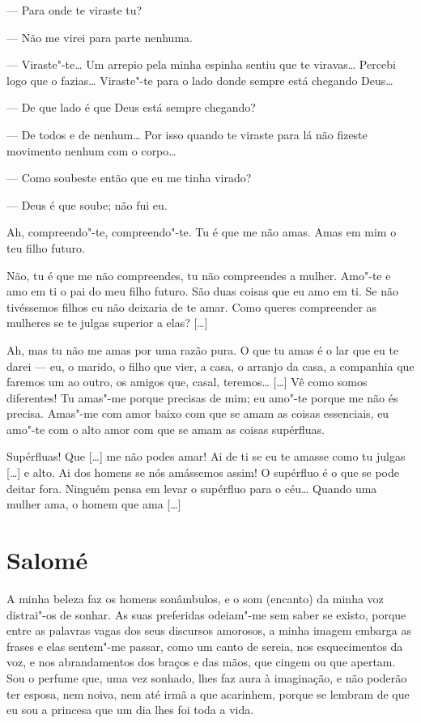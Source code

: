 \asterisc
\forceindent{}--- Para onde te viraste tu?

--- Não me virei para parte nenhuma.

--- Viraste"-te\ldots{} Um arrepio pela minha espinha sentiu que te viravas\ldots{}
Percebi logo que o fazias\ldots{} Viraste"-te para o lado donde sempre está
chegando Deus\ldots{}

--- De que lado é que Deus está sempre chegando?

--- De todos e de nenhum\ldots{} Por isso quando te viraste para lá não
fizeste movimento nenhum com o corpo\ldots{}

--- Como soubeste então que eu me tinha virado?

--- Deus é que soube; não fui eu.

\asterisc

 Ah, compreendo"-te, compreendo"-te. Tu é que me não amas. Amas em mim
o teu filho futuro.

 Não, tu é que me não compreendes, tu não compreendes a mulher.
Amo"-te e amo em ti o pai do meu filho futuro. São duas coisas que eu
amo em ti. Se não tivéssemos filhos eu não deixaria de te amar. Como
queres compreender as mulheres se te julgas superior a elas? [\ldots{}]

 Ah, mas tu não me amas por uma razão pura. O que tu amas é o lar
que eu te darei --- eu, o marido, o filho que vier, a casa, o arranjo
da casa, a companhia que faremos um ao outro, os amigos que, casal,
teremos\ldots{} [\ldots{}] Vê como somos diferentes! Tu amas"-me porque precisas
de mim; eu amo"-te porque me não és precisa. Amas"-me com amor baixo
com que se amam as coisas essenciais, eu amo"-te com o alto amor com
que se amam as coisas supérfluas.

 Supérfluas! Que [\ldots{}] me não podes amar! Ai de ti se eu te amasse
como tu julgas [\ldots{}] e alto. Ai dos homens se nós amássemos assim! O
supérfluo é o que se pode deitar fora. Ninguém pensa em levar o
supérfluo para o céu\ldots{} Quando uma mulher ama, o homem que ama [\ldots{}]


\chapter{Salomé}

 A minha beleza faz os homens sonâmbulos, e o som (encanto)
da minha voz distrai"-os de sonhar. As suas preferidas odeiam"-me sem
saber se existo, porque entre as palavras vagas dos seus discursos
amorosos, a minha imagem embarga as frases e elas sentem"-me passar,
como um canto de sereia, nos esquecimentos da voz, e nos
abrandamentos dos braços e das mãos, que cingem ou que apertam. Sou o
perfume que, uma vez sonhado, lhes faz aura à imaginação, e não
poderão ter esposa, nem noiva, nem até irmã a que acarinhem, porque
se lembram de que eu sou a princesa que um dia lhes foi toda a vida. 

